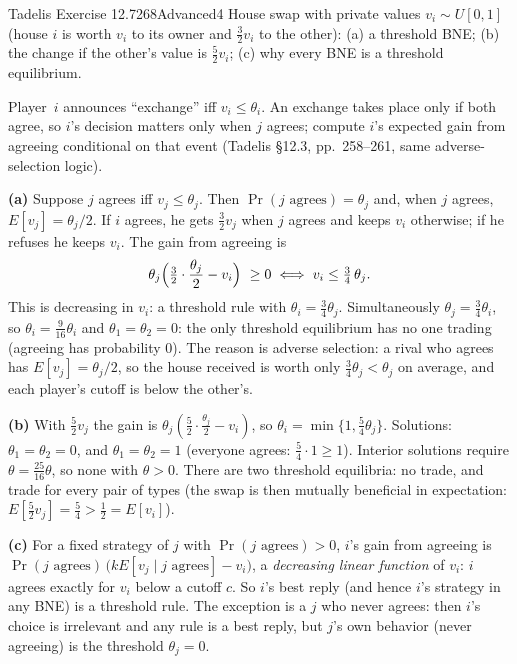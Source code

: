 \begin{exsol}{Tadelis Exercise 12.7}{268}{Advanced}{4}
\asked House swap with private values $v_i\sim U[0,1]$ (house $i$ is worth $v_i$ to its owner and
$\tfrac32v_i$ to the other): (a) a threshold BNE; (b) the change if the other's value is $\tfrac52v_i$;
(c) why every BNE is a threshold equilibrium.

\method Player~$i$ announces ``exchange'' iff $v_i\le\theta_i$. An exchange takes place only if both
agree, so $i$'s decision matters only when $j$ agrees; compute $i$'s expected gain from agreeing
conditional on that event (Tadelis \S12.3, pp.~258--261, same adverse-selection logic).

\solution
\textbf{(a)} Suppose $j$ agrees iff $v_j\le\theta_j$. Then $\Pr(j\text{ agrees})=\theta_j$ and, when $j$
agrees, $E[v_j]=\theta_j/2$. If $i$ agrees, he gets $\tfrac32v_j$ when $j$ agrees and keeps
$v_i$ otherwise; if he refuses he keeps $v_i$. The gain from agreeing is
\[
  \theta_j\Bigl(\tfrac32\cdot\frac{\theta_j}2-v_i\Bigr)\ \ge0\iff v_i\le\tfrac34\,\theta_j .
\]
This is decreasing in $v_i$: a threshold rule with $\theta_i=\tfrac34\theta_j$. Simultaneously
$\theta_j=\tfrac34\theta_i$, so $\theta_i=\tfrac9{16}\theta_i$ and $\theta_1=\theta_2=0$: the only
threshold equilibrium has no one trading (agreeing has probability $0$). The reason is adverse
selection: a rival who agrees has $E[v_j]=\theta_j/2$, so the house received is worth only
$\tfrac34\theta_j<\theta_j$ on average, and each player's cutoff is below the other's.

\textbf{(b)} With $\tfrac52v_j$ the gain is $\theta_j(\tfrac52\cdot\tfrac{\theta_j}2-v_i)$, so
$\theta_i=\min\{1,\tfrac54\theta_j\}$. Solutions: $\theta_1=\theta_2=0$, and $\theta_1=\theta_2=1$
(everyone agrees: $\tfrac54\cdot1\ge1$). Interior solutions require $\theta=\tfrac{25}{16}\theta$, so none
with $\theta>0$. There are two threshold equilibria: no trade, and trade for every pair of
types (the swap is then mutually beneficial in expectation: $E[\tfrac52v_j]=\tfrac54>\tfrac12=E[v_i]$).

\textbf{(c)} For a fixed strategy of $j$ with $\Pr(j\text{ agrees})>0$, $i$'s gain from agreeing is
$\Pr(j\text{ agrees})\,\bigl(kE[v_j\mid j\text{ agrees}]-v_i\bigr)$, a \emph{decreasing linear function} of $v_i$:
$i$ agrees exactly for $v_i$ below a cutoff $c$. So $i$'s best reply (and hence $i$'s strategy in
any BNE) is a threshold rule. The exception is a $j$ who never agrees: then $i$'s choice is
irrelevant and any rule is a best reply, but $j$'s own behavior (never agreeing) is the
threshold $\theta_j=0$.


\end{exsol}
